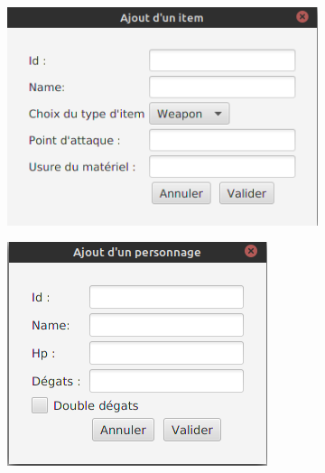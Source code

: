 			\begin{centering}
			\begin{figure}[H]
				\begin{subfigure}[b]{0.37\textwidth}
					\includegraphics[width=\textwidth, keepaspectratio]{img/item.png}
				\end{subfigure}
				\begin{subfigure}[b]{0.3\textwidth}
					\includegraphics[width=\textwidth, keepaspectratio]{img/personnage.png}
				\end{subfigure}
			\end{figure}
		\end{centering}

